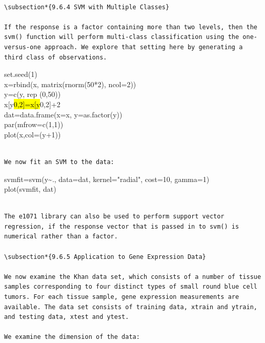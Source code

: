 \documentclass[10pt]{article}
\begin{document}
\begin{verbatim}

\subsection*{9.6.4 SVM with Multiple Classes}

If the response is a factor containing more than two levels, then the svm() function will perform multi-class classification using the one-versus-one approach. We explore that setting here by generating a third class of observations.
\end{verbatim}

\begin{displayquote}
set.seed(1)\\
x=rbind(x, matrix(rnorm(50*2), ncol=2))\\
y=c(y, rep (0,50))\\
x[y\hl{0,2]=x[y}0,2]+2\\
dat=data.frame(x=x, y=as.factor(y))\\
par(mfrow=c(1,1))\\
plot(x,col=(y+1))
\end{displayquote}

\begin{verbatim}

We now fit an SVM to the data:
\end{verbatim}

\begin{displayquote}
svmfit=svm(y\~{}., data=dat, kernel="radial", cost=10, gamma=1)\\
plot(svmfit, dat)
\end{displayquote}

\begin{verbatim}

The e1071 library can also be used to perform support vector regression, if the response vector that is passed in to svm() is numerical rather than a factor.

\subsection*{9.6.5 Application to Gene Expression Data}

We now examine the Khan data set, which consists of a number of tissue samples corresponding to four distinct types of small round blue cell tumors. For each tissue sample, gene expression measurements are available. The data set consists of training data, xtrain and ytrain, and testing data, xtest and ytest.

We examine the dimension of the data:
\end{verbatim}
\end{document}

